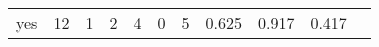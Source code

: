 \begin{longtable}{lp{1.10cm}p{1.10cm}p{1.10cm}p{1.10cm}p{1.10cm}p{1.10cm}p{1.10cm}p{1.10cm}p{1.10cm}p{1.10cm}}
yes       &                     12 &                                  1 &                                 2 &                                4 &                                 0 &                               5 &                          0.625 &                                 0.917 &                               0.417 \\
\end{longtable}
